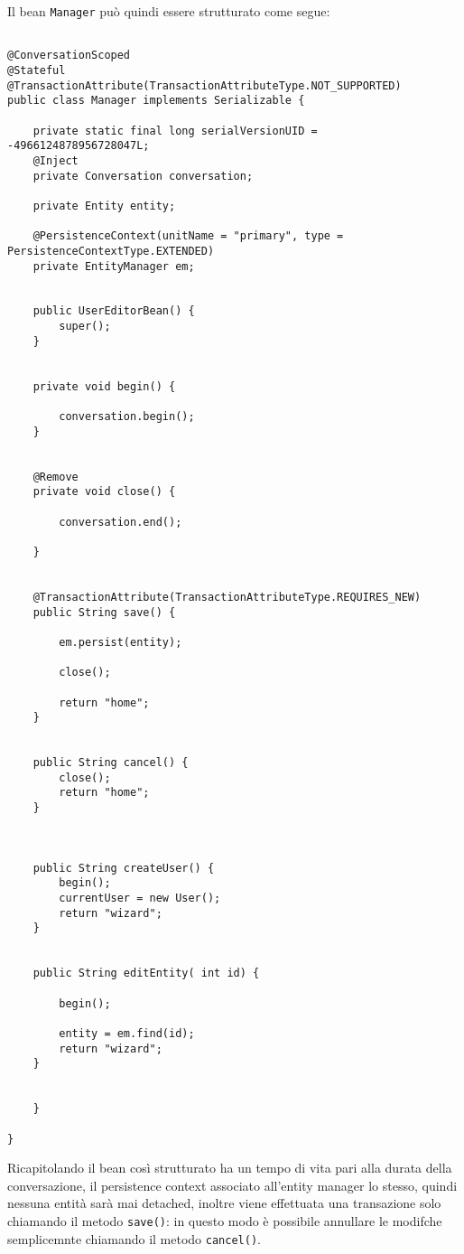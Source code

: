 Il bean \texttt{Manager} può quindi essere strutturato come segue:

\begin{lstlisting}
 
@ConversationScoped
@Stateful
@TransactionAttribute(TransactionAttributeType.NOT_SUPPORTED)
public class Manager implements Serializable {

	private static final long serialVersionUID = -4966124878956728047L;
	@Inject
	private Conversation conversation;

	private Entity entity;

	@PersistenceContext(unitName = "primary", type = PersistenceContextType.EXTENDED)
	private EntityManager em;


	public UserEditorBean() {
		super();
	}


	private void begin() {

		conversation.begin();
	}


	@Remove
	private void close() {

		conversation.end();

	}


	@TransactionAttribute(TransactionAttributeType.REQUIRES_NEW)
	public String save() {
		
		em.persist(entity);
		
		close();

		return "home";
	}


	public String cancel() {
		close();
		return "home";
	}


	
	public String createUser() {
		begin();
		currentUser = new User();
		return "wizard";
	}


	public String editEntity( int id) {

		begin();

		entity = em.find(id);
		return "wizard";
	}


	}

}
\end{lstlisting}

Ricapitolando il bean così strutturato ha un tempo di vita pari alla durata della conversazione, il persistence context associato all'entity manager lo stesso, quindi nessuna entità sarà mai detached, inoltre viene effettuata una
transazione solo chiamando il metodo \texttt{save()}: in questo modo è possibile annullare le modifche semplicemnte chiamando il metodo \texttt{cancel()}.




